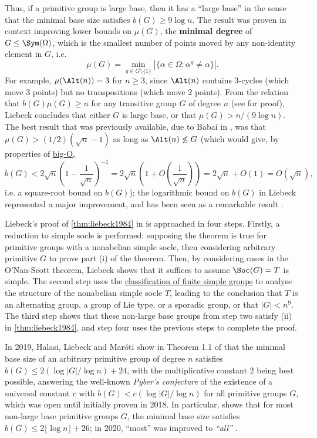 Thus, if a primitive group is large base, then it has a ``large base'' in the sense that the minimal base size satisfies $b(G) \geq 9\log n$. The result was proven in context improving lower bounds on $\mu(G)$, the \textbf{minimal degree} of $G \leq \Sym(\Omega)$, which is the smallest number of points moved by any non-identity element in $G$, i.e.
$$\mu(G) = \min_{g \in G \setminus \{1\}}|\{\alpha \in \Omega : \alpha^g \neq \alpha\}|.$$
For example, $\mu(\Alt(n)) = 3$ for $n \geq 3$, since $\Alt(n)$ contains 3-cycles (which move 3 points) but no transpositions (which move 2 points). From the relation that $b(G)\mu(G) \geq n$ for any transitive group $G$ of degree $n$ (see \cite{cameron1984} for proof), Liebeck concludes that either $G$ is large base, or that $\mu(G) > n/(9 \log n)$. The best result that was previously available, due to Babai in \cite{babai1981}, was that $\mu(G) > (1/2)(\sqrt{n} - 1)$ as long as $\Alt(n) \not\leq G$ (which would give, by properties of \hyperref[def:big_O_notation]{big-O},
$$b(G) < 2\sqrt{n}\left(1 - \frac{1}{\sqrt{n}}\right)^{-1} = 2\sqrt{n}\left(1 + O\left(\frac{1}{\sqrt{n}}\right)\right) = 2\sqrt{n} + O(1) = O(\sqrt{n}),$$
i.e. a square-root bound on $b(G)$); the logarithmic bound on $b(G)$ in Liebeck represented a major improvement, and has been seen as a remarkable result \cite{moscatiello_roney-dougal2021}.

Liebeck's proof of \autoref{thm:liebeck1984} in \cite{liebeck1984} is approached in four steps. Firstly, a reduction to simple socle is performed: supposing the theorem is true for primitive groups with a nonabelian simple socle, then considering arbitrary primitive $G$ to prove part (i) of the theorem. Then, by considering cases in the O'Nan-Scott theorem, Liebeck shows that it suffices to assume $\Soc(G) = T$ is simple. The second step uses the \hyperref[thm:cfsg]{classification of finite simple groups} to analyse the structure of the nonabelian simple socle $T$, leading to the conclusion that $T$ is an alternating group, a group of Lie type, or a sporadic group, or that $|G| < n^9$. The third step shows that these non-large base groups from step two satisfy (ii) in \autoref{thm:liebeck1984}, and step four uses the previous steps to complete the proof.

In 2019, Halasi, Liebeck and Mar\'oti show in Theorem 1.1 of \cite{halasi2019} that the minimal base size of an arbitrary primitive group of degree $n$ satisfies $b(G) \leq 2(\log|G|/\log n) + 24$, with the multiplicative constant 2 being best possible, answering the well-known \textit{Pyber's conjecture} of the existence of a universal constant $c$ with $b(G) < c(\log|G|/\log n)$ for all primitive groups $G$, which was open until initially proven in 2018. In particular, \cite{halasi2019} shows that for most non-large base primitive groups $G$, the minimal base size satisfies $b(G) \leq 2\lfloor\log n\rfloor + 26$; in 2020, ``most'' was improved to \textit{``all''} \cite{moscatiello_roney-dougal2021}.

